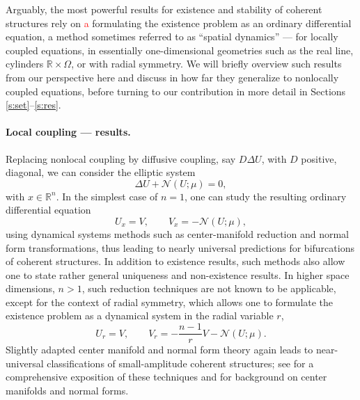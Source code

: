 \documentclass[10pt]{article}
\newcommand{\R}{\mathbb{R}}
\newcommand{\Nl}{\mathcal{N}}
\begin{document}
Arguably, the most powerful results for existence and stability of coherent structures rely on \textcolor{red}a formulating the existence problem as an ordinary differential equation, a method sometimes referred to as ``spatial dynamics'' \cite{sandtw} --- for locally coupled equations, in essentially one-dimensional geometries such as the real line, cylinders $\R\times\Omega$, or with radial symmetry. We will briefly overview such results from our perspective here and discuss in how far they generalize to nonlocally coupled equations, before turning to our contribution in more detail in Sections \ref{s:set}--\ref{s:res}. 


\paragraph{Local coupling --- results.} 
Replacing nonlocal coupling by diffusive coupling, say $D\Delta U$, with $D$ positive, diagonal, we can consider  the elliptic system 
\begin{equation}\label{e:rd}
\Delta U + \Nl(U;\mu)=0,
\end{equation}
with $x\in\R^n$. In the simplest case of $n=1$, one can study the resulting ordinary differential equation 
\begin{equation*}
U_x=V,\qquad 
V_x=-\Nl(U;\mu),
\end{equation*}
using dynamical systems methods such as center-manifold reduction and normal form transformations, thus leading to nearly universal predictions for bifurcations of coherent structures. In addition to existence results, such methods also allow one to state rather general uniqueness and non-existence results. In higher space dimensions, $n>1$, such reduction techniques are not known to be applicable, except for the context of radial symmetry, which allows one to formulate the existence problem as a dynamical system in the radial variable $r$, 
\begin{equation*}
U_r=V,\qquad
V_r=-\frac{n-1}{r}V-\Nl(U;\mu).
\end{equation*}
Slightly adapted center manifold and normal form theory again leads to near-universal classifications of small-amplitude coherent structures; see \cite{Srad} for a comprehensive exposition of these techniques and \cite{harioo} for background on center manifolds and normal forms. 
\end{document}
